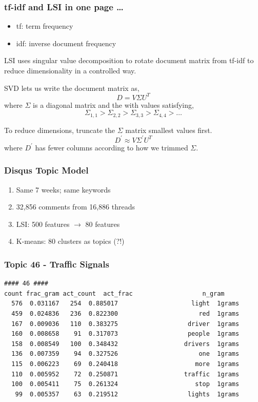 \documentclass{beamer}
\begin{document}
\begin{frame}
\frametitle{tf-idf and LSI in one page \dots} 
\begin{itemize}
\item tf: term frequency
\item idf: inverse document frequency
\end{itemize}

LSI uses singular value decomposition to rotate  document matrix from tf-idf to reduce
dimensionality in a controlled way.

SVD lets us write the document matrix as,
\begin{equation*}
D = V\Sigma U^T
\label{eq:svd}
\end{equation*}
where $\Sigma$ is a diagonal matrix and the with values satisfying,
\begin{equation*}
\Sigma_{1,1} > \Sigma_{2,2} > \Sigma_{3,3} > \Sigma_{4,4} > \ldots
\label{eq:svd}
\end{equation*}

To reduce dimensions, truncate the $\Sigma$ matrix smallest values first.
\begin{equation*}
D^\prime \approx V\Sigma^\prime U^T
\label{eq:svd}
\end{equation*}
where $D^\prime$ has fewer columns according to how we trimmed $\Sigma$.
\end{frame}


\begin{frame}\frametitle{Disqus Topic Model}
\begin{center}
{\Large 
\begin{enumerate}
\item Same 7 weeks; same keywords
\item 32,856 comments from 16,886 threads
\item LSI: 500 features $\rightarrow$ 80 features
\item K-means: 80 clusters as topics (?!)
\end{enumerate}
}
\end{center}
\end{frame}

\begin{frame}[fragile]\frametitle{Topic 46 - Traffic Signals}
\begin{verbatim}
#### 46 ####
count frac_gram act_count  act_frac                   n_gram
  576  0.031167   254  0.885017                    light  1grams
  459  0.024836   236  0.822300                      red  1grams
  167  0.009036   110  0.383275                   driver  1grams
  160  0.008658    91  0.317073                   people  1grams
  158  0.008549   100  0.348432                  drivers  1grams
  136  0.007359    94  0.327526                      one  1grams
  115  0.006223    69  0.240418                     more  1grams
  110  0.005952    72  0.250871                  traffic  1grams
  100  0.005411    75  0.261324                     stop  1grams
   99  0.005357    63  0.219512                   lights  1grams
\end{verbatim}
\end{frame}
\end{document}
